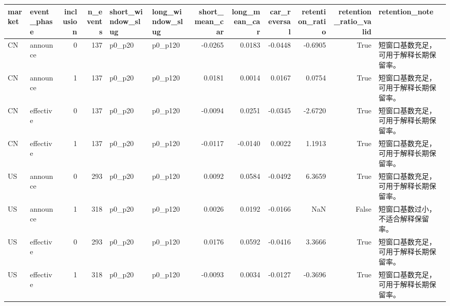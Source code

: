 \begin{tabular}{llrrllrrrrrl}
\toprule
market & event_phase & inclusion & n_events & short_window_slug & long_window_slug & short_mean_car & long_mean_car & car_reversal & retention_ratio & retention_ratio_valid & retention_note \\
\midrule
CN & announce & 0 & 137 & p0_p20 & p0_p120 & -0.0265 & 0.0183 & -0.0448 & -0.6905 & True & 短窗口基数充足，可用于解释长期保留率。 \\
CN & announce & 1 & 137 & p0_p20 & p0_p120 & 0.0181 & 0.0014 & 0.0167 & 0.0754 & True & 短窗口基数充足，可用于解释长期保留率。 \\
CN & effective & 0 & 137 & p0_p20 & p0_p120 & -0.0094 & 0.0251 & -0.0345 & -2.6720 & True & 短窗口基数充足，可用于解释长期保留率。 \\
CN & effective & 1 & 137 & p0_p20 & p0_p120 & -0.0117 & -0.0140 & 0.0022 & 1.1913 & True & 短窗口基数充足，可用于解释长期保留率。 \\
US & announce & 0 & 293 & p0_p20 & p0_p120 & 0.0092 & 0.0584 & -0.0492 & 6.3659 & True & 短窗口基数充足，可用于解释长期保留率。 \\
US & announce & 1 & 318 & p0_p20 & p0_p120 & 0.0026 & 0.0192 & -0.0166 & NaN & False & 短窗口基数过小，不适合解释保留率。 \\
US & effective & 0 & 293 & p0_p20 & p0_p120 & 0.0176 & 0.0592 & -0.0416 & 3.3666 & True & 短窗口基数充足，可用于解释长期保留率。 \\
US & effective & 1 & 318 & p0_p20 & p0_p120 & -0.0093 & 0.0034 & -0.0127 & -0.3696 & True & 短窗口基数充足，可用于解释长期保留率。 \\
\bottomrule
\end{tabular}
